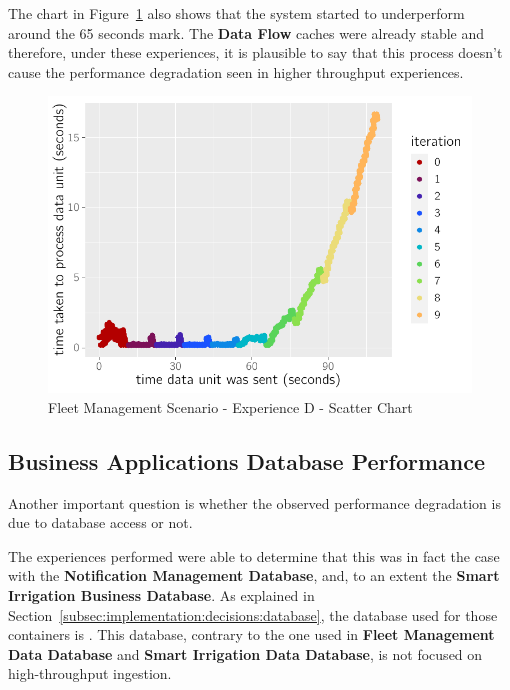  The chart in Figure~\ref{fig:evaluation:overview:cache:chart:s1eD} also shows that the system started to underperform around the 65 seconds mark. The \textbf{Data Flow} caches were already stable and therefore, under these experiences, it is plausible to say that this process doesn't cause the performance degradation seen in higher throughput experiences.

\begin{figure}[H]
    \centering
    \includegraphics[page=1]{assets/charts/s1eD.pdf}
    \caption[Fleet Management Scenario - Experience D - Scatter Chart]{Fleet Management Scenario - Experience D - Scatter Chart}
    \label{fig:evaluation:overview:cache:chart:s1eD}
\end{figure}

\subsection{Business Applications Database Performance}
\label{subsec:evaluation:overview:servicedatabase}

Another important question is whether the observed performance degradation is due to database access or not.

The experiences performed were able to determine that this was in fact the case with the \textbf{Notification Management Database}, and, to an extent the \textbf{Smart Irrigation Business Database}. As explained in Section~\ref{subsec:implementation:decisions:database}, the database used for those containers is .
This database, contrary to the one used in \textbf{Fleet Management Data Database} and \textbf{Smart Irrigation Data Database}, is not focused on high-throughput ingestion.

